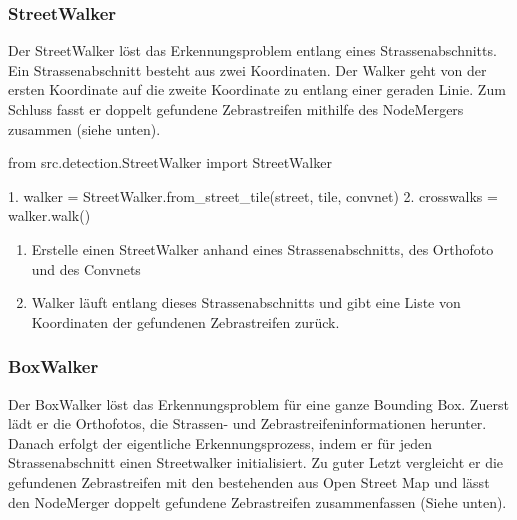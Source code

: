 \subsubsection{StreetWalker}
Der StreetWalker löst das Erkennungsproblem entlang eines Strassenabschnitts. Ein Strassenabschnitt besteht aus zwei Koordinaten. Der Walker geht von der ersten Koordinate auf die zweite Koordinate zu entlang einer geraden Linie. Zum Schluss fasst er doppelt gefundene Zebrastreifen mithilfe des NodeMergers zusammen (siehe unten).
\begin{python}
	from src.detection.StreetWalker import StreetWalker
	
	1. walker = StreetWalker.from_street_tile(street, tile, convnet)
	2. crosswalks = walker.walk()
\end{python}
\begin{enumerate}
	\item Erstelle einen StreetWalker anhand eines Strassenabschnitts, des Orthofoto und des Convnets
	\item Walker läuft entlang dieses Strassenabschnitts und gibt eine Liste von Koordinaten der gefundenen Zebrastreifen zurück.
\end{enumerate}

\subsubsection{BoxWalker}
Der BoxWalker löst das Erkennungsproblem für eine ganze Bounding Box. Zuerst lädt er die Orthofotos, die Strassen- und Zebrastreifeninformationen herunter. Danach erfolgt der eigentliche Erkennungsprozess, indem er für jeden Strassenabschnitt einen Streetwalker initialisiert. Zu guter Letzt vergleicht er die gefundenen Zebrastreifen mit den bestehenden aus Open Street Map und lässt den NodeMerger doppelt gefundene Zebrastreifen zusammenfassen (Siehe unten).

